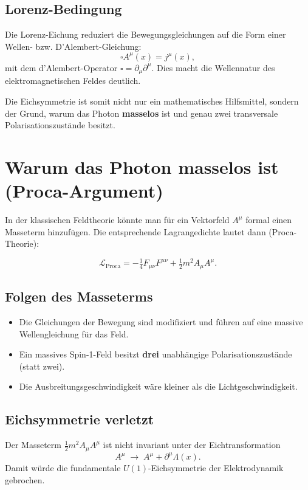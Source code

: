 \subsection*{Lorenz-Bedingung}
Die Lorenz-Eichung reduziert die Bewegungsgleichungen auf die Form einer 
Wellen- bzw. D’Alembert-Gleichung:
\[
\square A^\mu(x) = j^\mu(x),
\]
mit dem d’Alembert-Operator \(\square = \partial_\mu \partial^\mu\).
Dies macht die Wellennatur des elektromagnetischen Feldes deutlich.

\medskip
Die Eichsymmetrie ist somit nicht nur ein mathematisches Hilfsmittel, 
sondern der Grund, warum das Photon \textbf{masselos} ist und 
genau zwei transversale Polarisationszustände besitzt.
\section{Warum das Photon masselos ist \newline (Proca-Argument)}
\label{anhangA:masselosigkeit_proca}

In der klassischen Feldtheorie könnte man für ein Vektorfeld \( A^\mu \) 
formal einen Masseterm hinzufügen. Die entsprechende Lagrangedichte 
lautet dann (Proca-Theorie):

\[
\mathcal{L}_{\text{Proca}} = -\tfrac{1}{4} F_{\mu\nu} F^{\mu\nu} 
+ \tfrac{1}{2} m^2 A_\mu A^\mu .
\]

\subsection*{Folgen des Masseterms}
\begin{itemize}
	\item Die Gleichungen der Bewegung sind modifiziert und führen 
	auf eine massive Wellengleichung für das Feld.
	\item Ein massives Spin-1-Feld besitzt \textbf{drei} unabhängige 
	Polarisationszustände (statt zwei).
	\item Die Ausbreitungsgeschwindigkeit wäre kleiner als die Lichtgeschwindigkeit.
\end{itemize}

\subsection*{Eichsymmetrie verletzt}
Der Masseterm \( \tfrac{1}{2} m^2 A_\mu A^\mu \) 
ist nicht invariant unter der Eichtransformation
\[
A^\mu \;\to\; A^\mu + \partial^\mu \Lambda(x).
\]
Damit würde die fundamentale \(U(1)\)-Eichsymmetrie der Elektrodynamik gebrochen.

